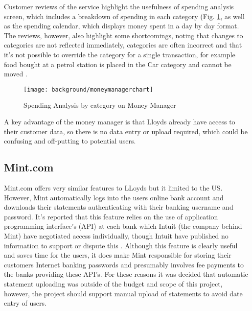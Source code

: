 Customer reviews of the service highlight the usefulness of spending analysis screen, which includes a breakdown of spending in each \gls{category} (Fig. \ref{fig:moneymanager}, as well as the spending calendar, which displays money spent in a day by day format.
%
The reviews, however, also highlight some shortcomings, noting that changes to categories are not reflected immediately, categories are often incorrect and that it's not possible to override the \gls{category} for a single transaction, for example food bought at a petrol station is placed in the Car \gls{category} and cannot be moved \cite{moneywatch2011lloyds, moneysupermarket2011lloyds}.

\begin{figure}[h]
    \centering
    \texttt{[image: background/moneymanagerchart]}
    \caption{Spending Analysis by category on Money Manager \parencite{lloyds2014money}}
    \label{fig:moneymanager}
\end{figure}

A key advantage of the money manager is that Lloyds already have access to their customer data, so there is no data entry or upload required, which could be confusing and off-putting to potential users.

\subsection{Mint.com}
Mint.com offers very similar features to LLoyds but it limited to the US. However, Mint automatically logs into the users online bank account and downloads their statements authenticating with their banking username and password. It's reported that this feature relies on the use of application programming interface's (API) at each bank which Intuit (the company behind Mint) have negotiated access individually, though Intuit have published no information to support or dispute this \cite{stackoverflow2012bankingapi, stackoverflow2012bankingapi2}.
% 
Although this feature is clearly useful and saves time for the users, it does make Mint responsible for storing their customers Internet banking passwords and presumably involves fee payments to the banks providing these API's.  
%
For these reasons it was decided that automatic statement uploading was outside of the budget and scope of this project, however, the project should support manual upload of statements to avoid date entry of users.  

